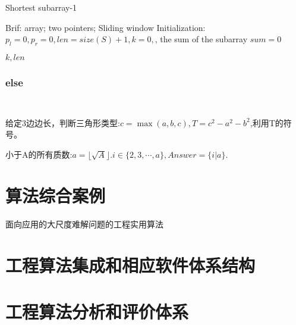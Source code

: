 \documentclass[UTF8]{../computerUniverse}
\begin{document}
\begin{algorithm}[h]%
  \caption{Shortest subarray-1}\label{algo:Shortest subarray-1}
  \SetAlgoLined
  Brif: array; two pointers; Sliding window\;
  \KwIn{ordered set $S = [S[0],S[size(S)]), the number t$.}
  Initialization:$p_{l} = 0,p_{r} = 0, len = size(S) + 1, k = 0,$, the sum of the subarray $sum = 0$\;
  \For {$p_{r} : [0, size(S))$}{
    $sum \leftarrow sum + s[p_{r}]$\;
    \While {$sum \geqslant t$}{
      $sum \leftarrow sum - s[p_{l}]$\;
      $len = \min(len, p_{r} - p_{l} + 1)$\;
      $k \leftarrow p_{l}$\;
      $p_{l} \leftarrow p_{l} + 1$\;
    }
  }
  
  \KwRet $k, len$\;
\end{algorithm}


\subsection{else}

\begin{lstlisting}


\end{lstlisting}

\begin{proposition}
  给定3边边长，判断三角形类型:$c = \max(a,b,c), T = c^2 -a^2-b^2$,利用T的符号。
\end{proposition}


\begin{proposition}
  小于A的所有质数:$a = \lfloor \sqrt{A}\rfloor. i\in \{2,3,\cdots, a\}, Answer  =\{i|a\} $.
\end{proposition}





\chapter{算法综合案例}
面向应用的大尺度难解问题的工程实用算法





\chapter{工程算法集成和相应软件体系结构}

\chapter{工程算法分析和评价体系}
\end{document}
